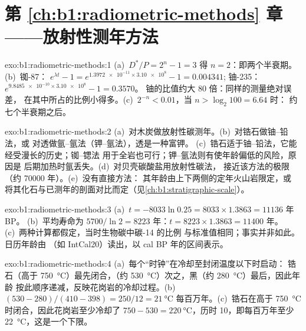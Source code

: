 \section*{第 \ref{ch:b1:radiometric-methods} 章——放射性测年方法}

\begin{solution}{exo:b1:radiometric-methods:1}
(a)~$D^*/P = 2^n - 1 = 3$ 得 $n = 2$：即两个半衰期。(b)~铷-87：
$e^{\lambda t} - 1 = e^{\num{1.3972e-11} \times \num{3.10e8}} - 1 = 0.004341$;
铀-235：$e^{\num{9.8485e-10} \times \num{3.10e8}} - 1 = 0.3570$。
铀的比值约大 80 倍：同样的测量绝对误差，
在其中所占的比例小得多。(c)~$2^{-n} < 0.01$，当 $n > \log_2 100 = 6.64$ 时：
约七个半衰期之后。
\end{solution}

\begin{solution}{exo:b1:radiometric-methods:2}
(a)~对木炭做放射性碳测年。(b)~对锆石做铀–铅法，或
对透做氩–氩法（钾–氩法），透是一种富钾。
(c)~锆石适于铀–铅法，它能经受漫长的历史；铷–锶法
用于全岩也可行；钾–氩法则有使年龄偏低的风险，原因是
后期加热时氩丢失。(d)~对贝壳碳酸盐用放射性碳法，
接近该方法的极限（约 \num{70000} 年）。(e)~没有直接方法：
其年龄由上下两侧的定年火山岩限定，或
将其化石与已测年的剖面对比而定（见\cref{ch:b1:stratigraphic-scale}）。
\end{solution}

\begin{solution}{exo:b1:radiometric-methods:3}
(a)~$t = -8033 \ln 0.25 = 8033 \times 1.3863 = \num{11136}$ 年 BP。
(b)~平均寿命为 $5700/\ln 2 = \num{8223}$ 年：$t = 8223 \times 1.3863 =
\num{11400}$ 年。(c)~两种计算都假定，当时生物碳中碳-14 的比例
与标准值相同；事实并非如此。日历年龄由
（如 IntCal20）读出，以 cal BP 年的区间表示。
\end{solution}

\begin{solution}{exo:b1:radiometric-methods:4}
(a)~每个“时钟”在冷却至封闭温度以下时启动：
锆石（高于 \qty{750}{\celsius}）最先闭合，（约
\qty{530}{\celsius}）次之，黑（约 \qty{280}{\celsius}）最后，因此年龄
按此顺序递减，反映花岗岩的冷却过程。(b)~$(530 - 280)/(410 - 398) =
250/12 = \qty{21}{\celsius}$ 每百万年。(c)~锆石在高于
\qty{750}{\celsius}时闭合，因此花岗岩至少冷却了 $750 - 530 =
\qty{220}{\celsius}$，历时 \qty{10}{\Ma}，即每百万年至少
\qty{22}{\celsius}，这是一个下限。
\end{solution}

